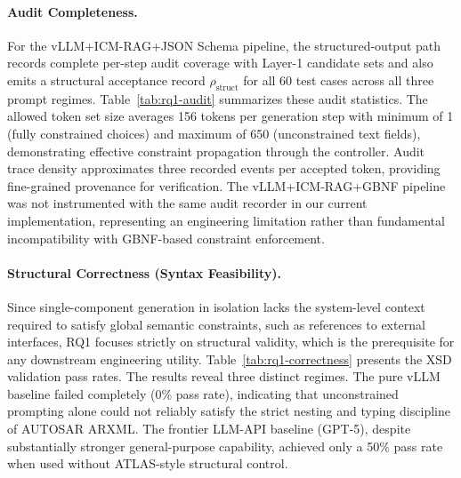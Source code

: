 \documentclass[acmlarge,nonacm]{acmart}
\theoremstyle{acmplain}
\theoremstyle{acmdefinition}
\begin{document}
\paragraph{Audit Completeness.} For the vLLM+ICM-RAG+JSON Schema pipeline, the structured-output path records complete per-step audit coverage with Layer-1 candidate sets and also emits a structural acceptance record $\rho_{\text{struct}}$ for all 60 test cases across all three prompt regimes. Table~\ref{tab:rq1-audit} summarizes these audit statistics. The allowed token set size averages 156 tokens per generation step with minimum of 1 (fully constrained choices) and maximum of 650 (unconstrained text fields), demonstrating effective constraint propagation through the controller. Audit trace density approximates three recorded events per accepted token, providing fine-grained provenance for verification. The vLLM+ICM-RAG+GBNF pipeline was not instrumented with the same audit recorder in our current implementation, representing an engineering limitation rather than fundamental incompatibility with GBNF-based constraint enforcement.

\begin{table}[!htbp]
\centering
\caption{Layer-1 auditing statistics for vLLM+ICM-RAG+JSON Schema pipeline, showing audit coverage and constraint effectiveness across prompt regimes.}
\label{tab:rq1-audit}

\end{table}


\paragraph{Structural Correctness (Syntax Feasibility).}
Since single-component generation in isolation lacks the system-level context required to satisfy global semantic constraints, such as references to external interfaces, RQ1 focuses strictly on structural validity, which is the prerequisite for any downstream engineering utility.
Table~\ref{tab:rq1-correctness} presents the XSD validation pass rates.
The results reveal three distinct regimes. The pure vLLM baseline failed completely (0\% pass rate), indicating that unconstrained prompting alone could not reliably satisfy the strict nesting and typing discipline of AUTOSAR ARXML. The frontier LLM-API baseline (GPT-5), despite substantially stronger general-purpose capability, achieved only a 50\% pass rate when used without ATLAS-style structural control.
\end{document}
